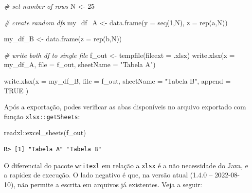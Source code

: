 \documentclass[
  11pt,
]{book}
\newenvironment{Shaded}{\begin{snugshade}}{\end{snugshade}}
\newcommand{\AttributeTok}[1]{\textcolor[rgb]{0.61,0.61,0.61}{#1}}
\newcommand{\CommentTok}[1]{\textcolor[rgb]{0.37,0.37,0.37}{\textit{#1}}}
\newcommand{\ConstantTok}[1]{\textcolor[rgb]{0,0,0}{#1}}
\newcommand{\DecValTok}[1]{\textcolor[rgb]{0.06,0.06,0.06}{#1}}
\newcommand{\FunctionTok}[1]{\textcolor[rgb]{0,0,0}{#1}}
\newcommand{\NormalTok}[1]{#1}
\newcommand{\OtherTok}[1]{\textcolor[rgb]{0.37,0.37,0.37}{#1}}
\newcommand{\SpecialCharTok}[1]{\textcolor[rgb]{0,0,0}{#1}}
\newcommand{\StringTok}[1]{\textcolor[rgb]{0.5,0.5,0.5}{#1}}
\begin{document}
\begin{Shaded}
\begin{Highlighting}[]
\CommentTok{\# set number of rows}
\NormalTok{N }\OtherTok{\textless{}{-}} \DecValTok{25}

\CommentTok{\# create random dfs}
\NormalTok{my\_df\_A }\OtherTok{\textless{}{-}} \FunctionTok{data.frame}\NormalTok{(}\AttributeTok{y =} \FunctionTok{seq}\NormalTok{(}\DecValTok{1}\NormalTok{,N),}
                      \AttributeTok{z =} \FunctionTok{rep}\NormalTok{(}\StringTok{\textquotesingle{}a\textquotesingle{}}\NormalTok{,N))}

\NormalTok{my\_df\_B }\OtherTok{\textless{}{-}} \FunctionTok{data.frame}\NormalTok{(}\AttributeTok{z =} \FunctionTok{rep}\NormalTok{(}\StringTok{\textquotesingle{}b\textquotesingle{}}\NormalTok{,N))}

\CommentTok{\# write both df to single file}
\NormalTok{f\_out }\OtherTok{\textless{}{-}} \FunctionTok{tempfile}\NormalTok{(}\AttributeTok{fileext =} \StringTok{\textquotesingle{}.xlsx\textquotesingle{}}\NormalTok{)}
\FunctionTok{write.xlsx}\NormalTok{(}\AttributeTok{x =}\NormalTok{ my\_df\_A,}
           \AttributeTok{file =}\NormalTok{ f\_out,}
           \AttributeTok{sheetName =} \StringTok{"Tabela A"}\NormalTok{)}

\FunctionTok{write.xlsx}\NormalTok{(}\AttributeTok{x =}\NormalTok{ my\_df\_B,}
           \AttributeTok{file =}\NormalTok{ f\_out,}
           \AttributeTok{sheetName =} \StringTok{"Tabela B"}\NormalTok{,}
           \AttributeTok{append =} \ConstantTok{TRUE}\NormalTok{ )}
\end{Highlighting}
\end{Shaded}

Após a exportação, podes verificar as abas disponíveis no arquivo exportado com função \texttt{xlsx::getSheets}:

\begin{Shaded}
\begin{Highlighting}[]
\NormalTok{readxl}\SpecialCharTok{::}\FunctionTok{excel\_sheets}\NormalTok{(f\_out)}
\end{Highlighting}
\end{Shaded}

\begin{verbatim}
R> [1] "Tabela A" "Tabela B"
\end{verbatim}

O diferencial do pacote \texttt{writexl} em relação a \texttt{xlsx} é a não necessidade do Java, e a rapidez de execução. O lado negativo é que, na versão atual (1.4.0 -- 2022-08-10), não permite a escrita em arquivos já existentes. Veja a seguir: 
\end{document}
